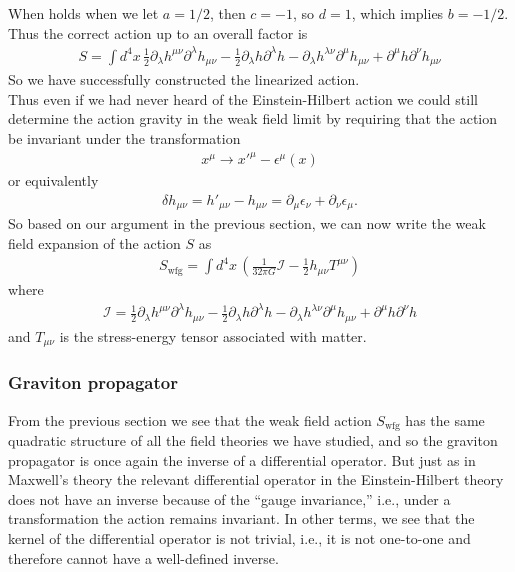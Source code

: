 \documentclass{book}
\theoremstyle{definition}
\newcommand{\p}{\partial}
\newcommand{\f}[2]{\frac{#1}{#2}}
\newcommand{\lp}{\left(}
\newcommand{\rp}{\right)}
\begin{document}
When holds when we let $a = 1/2$, then $c = -1$, so $d = 1$, which implies $b = -1/2$.
Thus the correct action up to an overall factor is
\begin{align}
\boxed{S = \int d^4x\, \f{1}{2}\p_\lambda h^{\mu\nu}\p^\lambda h_{\mu\nu} -\f{1}{2} \p_\lambda h \p^\lambda h -\p_\lambda h^{\lambda \nu}\p^\mu h_{\mu\nu} + \p^\mu h\p^\nu h_{\mu\nu}}
\end{align}
So we have successfully constructed the linearized action.\\

Thus even if we had never heard of the Einstein-Hilbert action we could still determine the action gravity in the weak field limit by requiring that the action be invariant under the transformation
\begin{align}
x^\mu \to x'^\mu - \epsilon^\mu(x)
\end{align}
or equivalently 
\begin{align}
\delta h_{\mu\nu} = h'_{\mu\nu} - h_{\mu\nu} = \p_\mu \epsilon_\nu +\p_\nu \epsilon_\mu. 
\end{align}
So based on our argument in the previous section, we can now write the weak field expansion of the action $S$ as
\begin{align}
\boxed{S_{\text{wfg}} = \int d^4x\, \lp \f{1}{32\pi G}\mathcal{I} - \f{1}{2}h_{\mu\nu}T^{\mu\nu} \rp}
\end{align}
where
\begin{align}
\mathcal{I} = \f{1}{2}\p_\lambda h^{\mu\nu}\p^\lambda h_{\mu\nu} -\f{1}{2} \p_\lambda h \p^\lambda h -\p_\lambda h^{\lambda \nu}\p^\mu h_{\mu\nu} + \p^\mu h\p^\nu h
\end{align}
and $T_{\mu\nu}$ is the stress-energy tensor associated with matter. 






\subsubsection{Graviton propagator}


From the previous section we see that the weak field action $S_{\text{wfg}}$ has the same quadratic structure of all the field theories we have studied, and so the graviton propagator is once again the inverse of a differential operator. But just as in Maxwell's theory the relevant differential operator in the Einstein-Hilbert theory does not have an inverse because of the ``gauge invariance,'' i.e., under a transformation the action remains invariant. In other terms, we see that the kernel of the differential operator is not trivial, i.e., it is not one-to-one and therefore cannot have a well-defined inverse. \\
\end{document}
